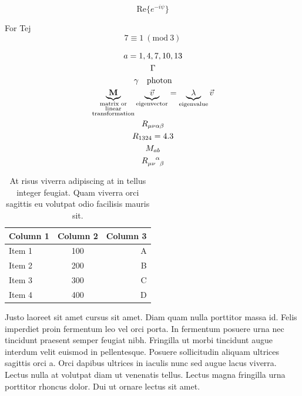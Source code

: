 \documentclass[12pt, a4paper]{article}
\numberwithin{equation}{section}
\begin{document}
\begin{equation}
  \mathrm{Re} \{ e^{-i \psi} \}
\end{equation}

For Tej
\begin{equation}
  7 \equiv 1 \ (\mathrm{mod} \ 3)
\end{equation}

\begin{gather}
  a = 1, 4, 7, 10, 13 \\
  \Gamma \\
  \gamma \quad \text{photon} \\
  \underbrace{\mathbf{M}}_{\substack{\text{matrix or} \\ \text{linear} \\ \text{transformation}}} \underbrace{\vec{v}}_{\text{eigenvector}} = \underbrace{\lambda}_{\text{eigenvalue}} \vec{v} \\
  R_{\mu \nu \alpha \beta} \\
  R_{1 3 2 4} = 4.3 \\
  M_{a b} \\
  \tensor{R}{_\mu_\nu^\alpha_\beta}
\end{gather}

\begin{table}[ht]
  \centering
  \caption{At risus viverra adipiscing at in tellus integer feugiat. Quam viverra orci sagittis eu volutpat odio facilisis mauris sit.}
  \label{tab:sampledata}
  \begin{tabular}{@{}lcr@{}} %
  \toprule
  Column 1 & Column 2 & Column 3 \\
  \midrule
  Item 1 & 100 & A \\
  Item 2 & 200 & B \\
  Item 3 & 300 & C \\
  Item 4 & 400 & D \\
  \bottomrule
  \end{tabular}
\end{table}

Justo laoreet sit amet cursus sit amet. Diam quam nulla porttitor massa id. Felis imperdiet proin fermentum leo vel orci porta. In fermentum posuere urna nec tincidunt praesent semper feugiat nibh. Fringilla ut morbi tincidunt augue interdum velit euismod in pellentesque. Posuere sollicitudin aliquam ultrices sagittis orci a. Orci dapibus ultrices in iaculis nunc sed augue lacus viverra. Lectus nulla at volutpat diam ut venenatis tellus. Lectus magna fringilla urna porttitor rhoncus dolor. Dui ut ornare lectus sit amet.
\end{document}
